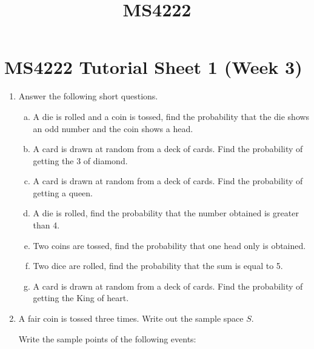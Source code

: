 \documentclass[]{article}
\begin{document}
\title{MS4222}



\section*{MS4222 Tutorial Sheet 1 (Week 3)}
\begin{enumerate}
\item Answer the following short questions.
\begin{enumerate}[(a)]
\item A die is rolled and a coin is tossed, find the probability that the die shows an odd number and the coin shows a head.
\item A card is drawn at random from a deck of cards. Find the probability of getting the 3 of diamond.
\item A card is drawn at random from a deck of cards. Find the probability of getting a queen.

\item A die is rolled, find the probability that the number obtained is greater than 4. 
\item Two coins are tossed, find the probability that one head only is obtained. 

\item  Two dice are rolled, find the probability that the sum is equal to 5. 

\item  A card is drawn at random from a deck of cards. Find the probability of getting the King of heart. 
\end{enumerate}






\item 
A fair coin is tossed three times. Write out the sample space $S$.

Write the sample points of the following events:


\end{enumerate}
\end{document}
